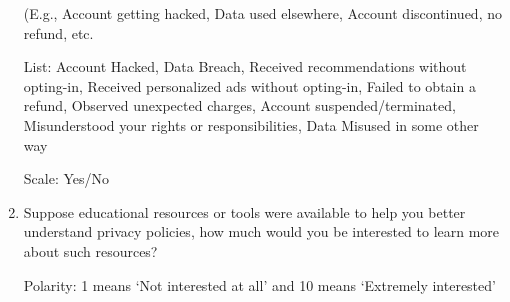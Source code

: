 \begin{enumerate}
    (E.g., Account getting hacked, Data used elsewhere, Account discontinued, no refund, etc.

    List: Account Hacked, 
    Data Breach,
    Received recommendations without opting-in,
    Received personalized ads without opting-in,
    Failed to obtain a refund,
    Observed unexpected charges,
    Account suspended/terminated,
    Misunderstood your rights or responsibilities,
    Data Misused in some other way
    
    Scale: Yes/No

    
    \item Suppose educational resources or tools were available to help you better understand privacy policies, how much would you be interested to learn more about such resources?

    
    
    Polarity: 1 means ‘Not interested at all’ and 10 means ‘Extremely interested’

    
\end{enumerate}